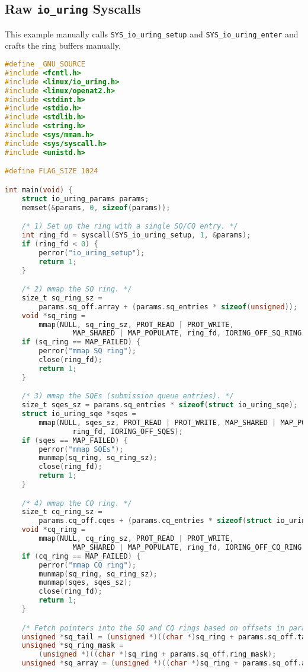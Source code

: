 \documentclass[11pt]{article}
\begin{document}
\subsection{Raw \texttt{io\_uring} Syscalls}
This example manually calls \texttt{SYS\_io\_uring\_setup} and \texttt{SYS\_io\_uring\_enter} and crafts the ring buffers manually.
\begin{lstlisting}[language=C]
#define _GNU_SOURCE
#include <fcntl.h>
#include <linux/io_uring.h>
#include <linux/openat2.h>
#include <stdint.h>
#include <stdio.h>
#include <stdlib.h>
#include <string.h>
#include <sys/mman.h>
#include <sys/syscall.h>
#include <unistd.h>

#define FLAG_SIZE 1024

int main(void) {
    struct io_uring_params params;
    memset(&params, 0, sizeof(params));

    /* 1) Set up the ring with a single SQ/CQ entry. */
    int ring_fd = syscall(SYS_io_uring_setup, 1, &params);
    if (ring_fd < 0) {
        perror("io_uring_setup");
        return 1;
    }

    /* 2) mmap the SQ ring. */
    size_t sq_ring_sz =
        params.sq_off.array + (params.sq_entries * sizeof(unsigned));
    void *sq_ring =
        mmap(NULL, sq_ring_sz, PROT_READ | PROT_WRITE,
                MAP_SHARED | MAP_POPULATE, ring_fd, IORING_OFF_SQ_RING);
    if (sq_ring == MAP_FAILED) {
        perror("mmap SQ ring");
        close(ring_fd);
        return 1;
    }

    /* 3) mmap the SQEs (submission queue entries). */
    size_t sqes_sz = params.sq_entries * sizeof(struct io_uring_sqe);
    struct io_uring_sqe *sqes =
        mmap(NULL, sqes_sz, PROT_READ | PROT_WRITE, MAP_SHARED | MAP_POPULATE,
                ring_fd, IORING_OFF_SQES);
    if (sqes == MAP_FAILED) {
        perror("mmap SQEs");
        munmap(sq_ring, sq_ring_sz);
        close(ring_fd);
        return 1;
    }

    /* 4) mmap the CQ ring. */
    size_t cq_ring_sz =
        params.cq_off.cqes + (params.cq_entries * sizeof(struct io_uring_cqe));
    void *cq_ring =
        mmap(NULL, cq_ring_sz, PROT_READ | PROT_WRITE,
                MAP_SHARED | MAP_POPULATE, ring_fd, IORING_OFF_CQ_RING);
    if (cq_ring == MAP_FAILED) {
        perror("mmap CQ ring");
        munmap(sq_ring, sq_ring_sz);
        munmap(sqes, sqes_sz);
        close(ring_fd);
        return 1;
    }

    /* Fetch pointers into the SQ and CQ rings based on offsets in params. */
    unsigned *sq_tail = (unsigned *)((char *)sq_ring + params.sq_off.tail);
    unsigned *sq_ring_mask =
        (unsigned *)((char *)sq_ring + params.sq_off.ring_mask);
    unsigned *sq_array = (unsigned *)((char *)sq_ring + params.sq_off.array);


\end{lstlisting}
\end{document}
